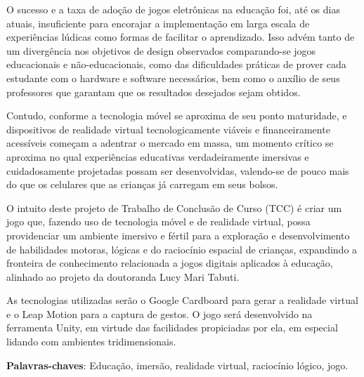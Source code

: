 \begin{resumo}
\begin{comment}
O resumo deve ser redigido, preferencialmente, na terceira pessoa do singular com verbo na voz ativa, em parágrafo único, e conter no máximo 500 palavras.
\end{comment}

O sucesso e a taxa de adoção de jogos eletrônicas na educação foi, até os dias atuais, insuficiente para encorajar a implementação em larga escala de experiências lúdicas como formas de facilitar o aprendizado. Isso advém tanto de um divergência nos objetivos de design observados comparando-se jogos educacionais e não-educacionais, como das dificuldades práticas de prover cada estudante com o hardware e software necessários, bem como o auxílio de seus professores que garantam que os resultados desejados sejam obtidos.

Contudo, conforme a tecnologia móvel se aproxima de seu ponto maturidade, e dispositivos de realidade virtual tecnologicamente viáveis e financeiramente acessíveis começam a adentrar o mercado em massa, um momento crítico se aproxima no qual experiências educativas verdadeiramente imersivas e cuidadosamente projetadas possam ser desenvolvidas, valendo-se de pouco mais do que os celulares que as crianças já carregam em seus bolsos.

O intuito deste projeto de Trabalho de Conclusão de Curso (TCC) é criar um jogo que, fazendo uso de tecnologia móvel e de realidade virtual, possa providenciar um ambiente imersivo e fértil para a exploração e desenvolvimento de habilidades motoras, lógicas e do raciocínio espacial de crianças, expandindo a fronteira de conhecimento relacionada a jogos digitais aplicados à educação, alinhado ao projeto da doutoranda Lucy Mari Tabuti.

As tecnologias utilizadas serão o Google Cardboard para gerar a realidade virtual e o Leap Motion para a captura de gestos. O jogo será desenvolvido na ferramenta Unity, em virtude das facilidades propiciadas por ela, em especial lidando com ambientes tridimensionais.

 \vspace{\onelineskip}

 \noindent
 \textbf{Palavras-chaves}: Educação, imersão, realidade virtual, raciocínio lógico, jogo.
\end{resumo}
 
